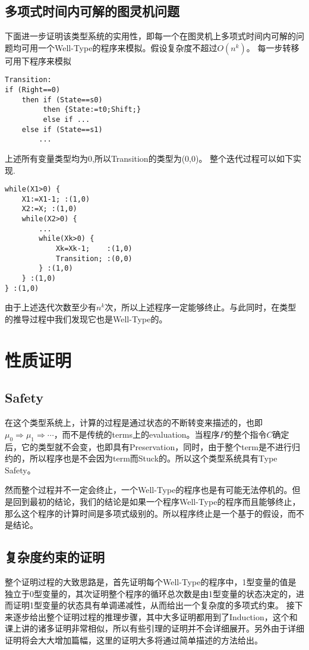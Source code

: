 \documentclass{ctexart}
\begin{document}
\subsection{多项式时间内可解的图灵机问题}
下面进一步证明该类型系统的实用性，即每一个在图灵机上多项式时间内可解的问题均可用一个Well-Type的程序来模拟。假设复杂度不超过$O(n^k)$。
每一步转移可用下程序来模拟
\begin{lstlisting}
Transition:
if (Right==0) 
	then if (State==s0) 
		 then {State:=t0;Shift;}
		 else if ...
	else if (State==s1) 
		...
\end{lstlisting}
上述所有变量类型均为0,所以Transition的类型为(0,0)。
整个迭代过程可以如下实现.
\begin{lstlisting}
while(X1>0) {
	X1:=X1-1; :(1,0)
	X2:=X; :(1,0)
	while(X2>0) {
		...
		while(Xk>0) {
			Xk=Xk-1;	:(1,0)
			Transition; :(0,0)
		} :(1,0)
	} :(1,0)
} :(1,0)
\end{lstlisting}
由于上述迭代次数至少有$n^k$次，所以上述程序一定能够终止。与此同时，在类型的推导过程中我们发现它也是Well-Type的。


\section{性质证明}
\subsection{Safety}
在这个类型系统上，计算的过程是通过状态的不断转变来描述的，也即$\mu_0\Rightarrow\mu_1\Rightarrow\cdots$，而不是传统的terms上的evaluation。当程序$P$的整个指令$C$确定后，它的类型就不会变，也即具有Preservation，同时，由于整个term是不进行归约的，所以程序也是不会因为term而Stuck的。所以这个类型系统具有Type Safety。

然而整个过程并不一定会终止，一个Well-Type的程序也是有可能无法停机的。但是回到最初的结论，我们的结论是如果一个程序Well-Type的程序而且能够终止，那么这个程序的计算时间是多项式级别的。所以程序终止是一个基于的假设，而不是结论。

\subsection{复杂度约束的证明}
整个证明过程的大致思路是，首先证明每个Well-Type的程序中，1型变量的值是独立于0型变量的，其次证明整个程序的循环总次数是由1型变量的状态决定的，进而证明1型变量的状态具有单调递减性，从而给出一个复杂度的多项式约束。
接下来逐步给出整个证明过程的推理步骤，其中大多证明都用到了Induction，这个和课上讲的诸多证明非常相似，所以有些引理的证明并不会详细展开。另外由于详细证明将会大大增加篇幅，这里的证明大多将通过简单描述的方法给出。
\end{document}
